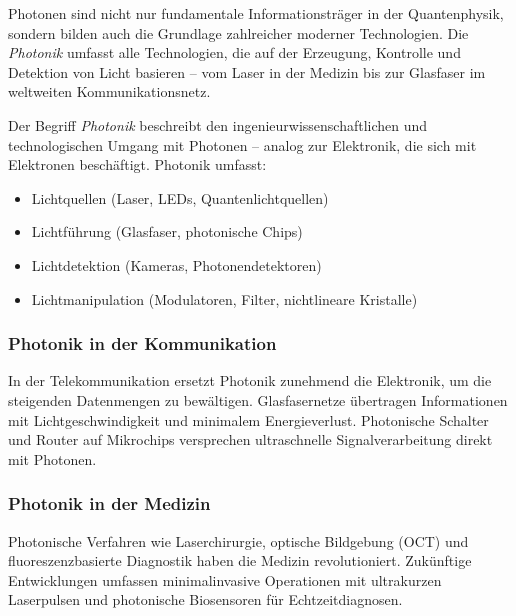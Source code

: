 Photonen sind nicht nur fundamentale Informationsträger in der Quantenphysik, sondern bilden auch die Grundlage zahlreicher moderner Technologien.  
Die \emph{Photonik} umfasst alle Technologien, die auf der Erzeugung, Kontrolle und Detektion von Licht basieren – vom Laser in der Medizin bis zur Glasfaser im weltweiten Kommunikationsnetz.
\vspace{1em}
\begin{tcolorbox}[hinweisbox, title=Was bedeutet „Photonik“? \label{box:photonics_definition}]
	\small
	Der Begriff \emph{Photonik} beschreibt den ingenieurwissenschaftlichen und technologischen Umgang mit Photonen – analog zur Elektronik, die sich mit Elektronen beschäftigt.  
	Photonik umfasst:
	\begin{itemize}
		\item Lichtquellen (Laser, LEDs, Quantenlichtquellen)
		\item Lichtführung (Glasfaser, photonische Chips)
		\item Lichtdetektion (Kameras, Photonendetektoren)
		\item Lichtmanipulation (Modulatoren, Filter, nichtlineare Kristalle)
	\end{itemize}
\end{tcolorbox}

\subsubsection{Photonik in der Kommunikation}

In der Telekommunikation ersetzt Photonik zunehmend die Elektronik, um die steigenden Datenmengen zu bewältigen. Glasfasernetze übertragen Informationen mit Lichtgeschwindigkeit und minimalem Energieverlust.  
Photonische Schalter und Router auf Mikrochips versprechen ultraschnelle Signalverarbeitung direkt mit Photonen.

\subsubsection{Photonik in der Medizin}

Photonische Verfahren wie Laserchirurgie, optische Bildgebung (OCT) und fluoreszenzbasierte Diagnostik haben die Medizin revolutioniert.  
Zukünftige Entwicklungen umfassen minimalinvasive Operationen mit ultrakurzen Laserpulsen und photonische Biosensoren für Echtzeitdiagnosen.

